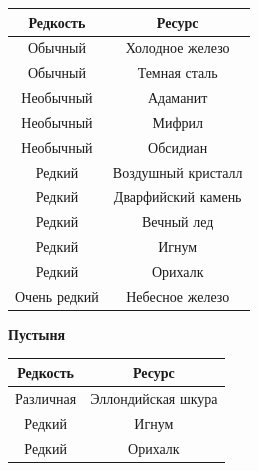 \documentclass[a4paper, 9pt, twocolumn]{book}
\begin{document}
\begin{minipage}{0.45\linewidth}
		 \begin{tabular}{|c|c|}
		 	\hline
		 	\textbf{Редкость} & \textbf{Ресурс} \\
		 	\hline
		 	Обычный & Холодное железо \\
		 	\hline
		 	Обычный & Темная сталь \\
		 	\hline
		 	Необычный & Адаманит \\
		 	\hline
		 	Необычный & Мифрил \\
		 	\hline
		 	Необычный & Обсидиан \\
		 	\hline
		 	Редкий & Воздушный кристалл \\
		 	\hline
		 	Редкий & Дварфийский камень \\
		 	\hline
		 	Редкий & Вечный лед \\
		 	\hline
		 	Редкий & Игнум \\
		 	\hline
		 	Редкий & Орихалк \\
		 	\hline
		 	Очень редкий & Небесное железо \\
		 	\hline
		 \end{tabular}
	 
	 	\medspace
	 	
	 	\textbf{Пустыня}
	 	
	 	\begin{tabular}{|c|c|}
	 		\hline
	 		\textbf{Редкость} & \textbf{Ресурс} \\
	 		\hline
	 		Различная & Эллондийская шкура \\
	 		\hline
	 		Редкий & Игнум \\
	 		\hline
	 		Редкий & Орихалк  \\
	 		\hline
	 	\end{tabular}
	\end{minipage}
\end{document}

